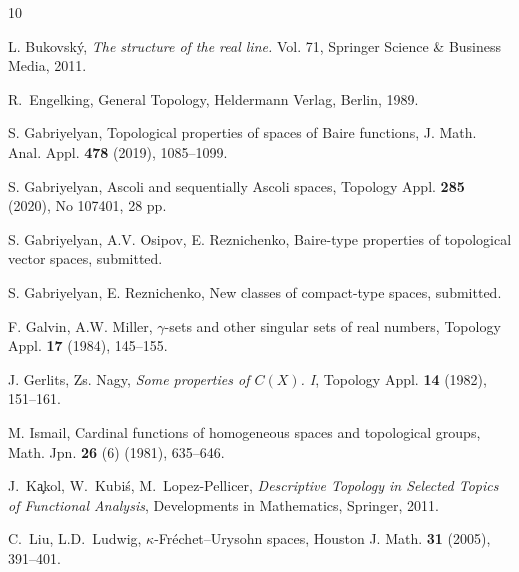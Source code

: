 \documentclass[preprint,11pt]{elsarticle}
\theoremstyle{definition}
\theoremstyle{remark}
\numberwithin{equation}{section}
\numberwithin{theorem}{section}
\begin{document}






\begin{thebibliography}{10}


L. Bukovsk\'y,  {\em The structure of the real line.} Vol. 71, Springer Science \& Business Media, 2011.

R.~Engelking, General Topology, Heldermann Verlag, Berlin, 1989.

S. Gabriyelyan, Topological properties of spaces of Baire functions, J. Math. Anal. Appl. \textbf{478} (2019), 1085--1099.

S. Gabriyelyan, Ascoli and sequentially Ascoli spaces, Topology Appl. \textbf{285} (2020), No 107401, 28 pp.


S. Gabriyelyan, A.V. Osipov, E. Reznichenko, Baire-type properties of topological vector spaces,  submitted.

S. Gabriyelyan, E. Reznichenko, New classes of compact-type spaces, submitted.

F. Galvin, A.W. Miller, $\gamma$-sets and other singular sets of real numbers, Topology Appl. \textbf{17} (1984), 145--155.


J. Gerlits, Zs. Nagy, \emph{Some properties of $C(X)$. I}, Topology Appl. \textbf{14} (1982),  151--161.

M. Ismail, Cardinal functions of homogeneous spaces and topological groups, Math. Jpn. \textbf{26} (6) (1981), 635--646.

J.~K\c{a}kol, W.~Kubi\'s, M.~Lopez-Pellicer, \emph{Descriptive Topology in Selected  Topics of Functional Analysis}, Developments in Mathematics, Springer, 2011.

C.~Liu, L.D.~Ludwig, $\kappa$-Fr\'{e}chet--Urysohn spaces, Houston J. Math. \textbf{31} (2005), 391--401.



\end{thebibliography}
\end{document}
